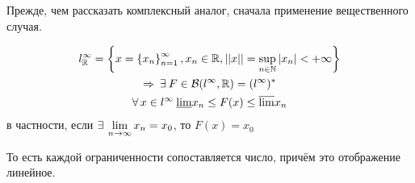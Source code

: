 \documentclass[document]{subfiles}
\begin{document}
Прежде, чем рассказать комплексный аналог, сначала применение вещественного случая.

\begin{theorem}
    \begin{gather*}
        l^\infty_{\bR} = \seq{x = \seq{x_n}^\infty_{n=1}, x_n \in \bR, \norm{x} = \sup_{n \in \bN} \abs{x_n} < + \infty} \\
        \Rightarrow \: \exists F \in \B(l^\infty, \bR) = (l^\infty)^* \\
        \forall x \in l^\infty \: \underline{\liml} x_n \leq F(x) \leq \overline{\liml} x_n
    \end{gather*}
    в частности, если $\exists \liml_{n \to \infty} x_n = x_0$, то $F(x) = x_0$
\end{theorem}
То есть каждой ограниченности сопоставляется число, причём это отображение линейное.
\end{document}
